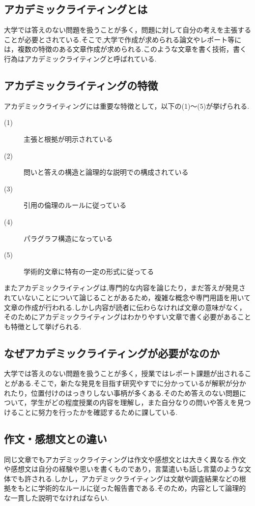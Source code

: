 \documentclass[a4j,12pt]{jarticle}
\begin{document}
\subsection{アカデミックライティングとは}
大学では答えのない問題を扱うことが多く，問題に対して自分の考えを主張することが必要とされている.そこで,大学で作成が求められる論文やレポート等には，複数の特徴のある文章作成が求められる.このような文章を書く技術，書く行為はアカデミックライティングと呼ばれている\cite{ren2}.
\subsection{アカデミックライティングの特徴}
アカデミックライティングには重要な特徴として，以下の(1)〜(5)が挙げられる.
\begin{description}
  \item[(1)] 主張と根拠が明示されている
  \item[(2)] 問いと答えの構造と論理的な説明での構成されている
  \item[(3)] 引用の倫理のルールに従っている
  \item[(4)] パラグラフ構造になっている
  \item[(5)] 学術的文章に特有の一定の形式に従ってる
 \end{description}
 
 またアカデミックライティングは,専門的な内容を論じたり，まだ答えが発見されていないことについて論じることがあるため，複雑な概念や専門用語を用いて文章の作成が行われる.しかし内容が読者に伝わらなければ文章の意味がなく，そのためにアカデミックライティングはわかりやすい文章で書く必要があることも特徴として挙げられる\cite{ren7}.
 
\newpage
\subsection{なぜアカデミックライティングが必要がなのか}
大学では答えのない問題を扱うことが多く，授業ではレポート課題が出されることがある.そこで，新たな発見を目指す研究やすでに分かっているが解釈が分かれたり，位置付けのはっきりしない事柄が多くある.そのため答えのない問題について，学生がどの程度授業の内容を理解し，また自分なりの問いや答えを見つけることに努力を行ったかを確認するために課している.

\subsection{作文・感想文との違い}
同じ文章でもアカデミックライティングは作文や感想文とは大きく異なる.作文や感想文は自分の経験や思いを書くものであり，言葉遣いも話し言葉のような文体でも許される.しかし，アカデミックライティングは文献や調査結果などの根拠をもとに学術的なルールに従った報告書である.そのため，内容として論理的な一貫した説明でなければならい.
\end{document}
